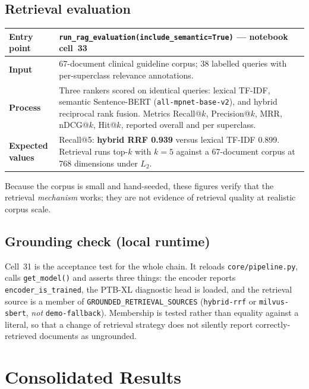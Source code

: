 \documentclass[11pt,a4paper]{article}
\newcommand{\code}[1]{\texttt{\small #1}}
\begin{document}
\subsection{Retrieval evaluation}

\begin{table}[!ht]
\centering
\small
\begin{tabular}{@{}p{2.4cm}p{12.4cm}@{}}
\toprule
\textbf{Entry point} & \code{run\_rag\_evaluation(include\_semantic=True)}
--- notebook cell~33\\
\midrule
\textbf{Input} & 67-document clinical guideline corpus; 38 labelled
queries with per-superclass relevance annotations.\\
\addlinespace
\textbf{Process} & Three rankers scored on identical queries: lexical
TF-IDF, semantic Sentence-BERT (\code{all-mpnet-base-v2}), and hybrid
reciprocal rank fusion. Metrics Recall@$k$, Precision@$k$, MRR, nDCG@$k$,
Hit@$k$, reported overall and per superclass.\\
\addlinespace
\textbf{Expected values} & Recall@5: \textbf{hybrid RRF 0.939} versus
lexical TF-IDF 0.899. Retrieval runs top-$k$ with $k=5$ against a 67-document
corpus at 768 dimensions under $L_2$.\\
\bottomrule
\end{tabular}
\end{table}

\noindent
Because the corpus is small and hand-seeded, these figures verify that the
retrieval \emph{mechanism} works; they are not evidence of retrieval
quality at realistic corpus scale.

\subsection{Grounding check (local runtime)}

Cell~31 is the acceptance test for the whole chain. It reloads
\code{core/pipeline.py}, calls \code{get\_model()} and asserts three
things: the encoder reports \code{encoder\_is\_trained}, the PTB-XL
diagnostic head is loaded, and the retrieval source is a member of
\code{GROUNDED\_RETRIEVAL\_SOURCES} (\code{hybrid-rrf} or
\code{milvus-sbert}, \emph{not} \code{demo-fallback}). Membership is
tested rather than equality against a literal, so that a change of
retrieval strategy does not silently report correctly-retrieved documents
as ungrounded.

\section{Consolidated Results}
\end{document}
